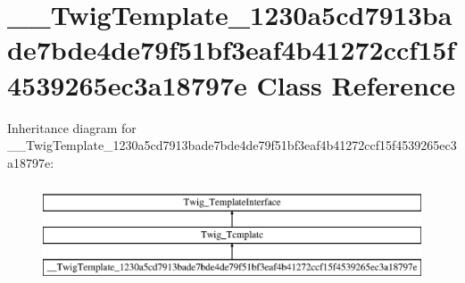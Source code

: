 \hypertarget{class_____twig_template__1230a5cd7913bade7bde4de79f51bf3eaf4b41272ccf15f4539265ec3a18797e}{}\section{\+\_\+\+\_\+\+Twig\+Template\+\_\+1230a5cd7913bade7bde4de79f51bf3eaf4b41272ccf15f4539265ec3a18797e Class Reference}
\label{class_____twig_template__1230a5cd7913bade7bde4de79f51bf3eaf4b41272ccf15f4539265ec3a18797e}
Inheritance diagram for \+\_\+\+\_\+\+Twig\+Template\+\_\+1230a5cd7913bade7bde4de79f51bf3eaf4b41272ccf15f4539265ec3a18797e\+:\begin{figure}[H]
\begin{center}
\leavevmode
\includegraphics[height=3.000000cm]{class_____twig_template__1230a5cd7913bade7bde4de79f51bf3eaf4b41272ccf15f4539265ec3a18797e}
\end{center}
\end{figure}
